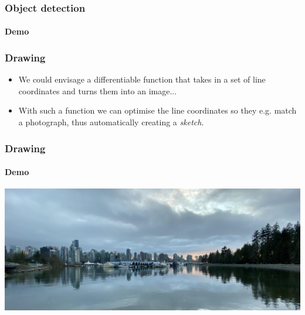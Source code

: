 \documentclass[\beamerclass]{beamer}
\begin{document}
\begin{frame}
\frametitle{Object detection}
\framesubtitle{Demo}

\end{frame}






\begin{frame}
\frametitle{Drawing}

\begin{itemize}
	\item We could envisage a differentiable function that takes in a set of line coordinates and turns them into an image...
	\item With such a function we can optimise the line coordinates so they e.g. match a photograph, thus automatically creating a \emph{sketch}.
\end{itemize}
\end{frame}

\begin{frame}
\frametitle{Drawing}
\framesubtitle{Demo}

\center
\includegraphics[width=\textwidth]{vancouver.jpg}

\end{frame}
\end{document}
